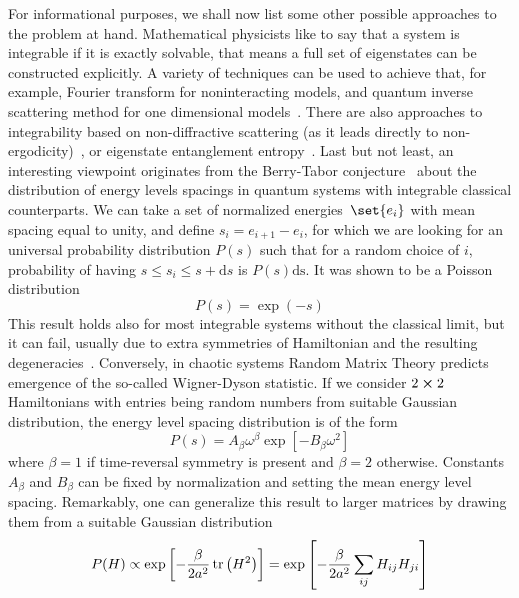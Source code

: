 For informational purposes, we shall now list some other possible approaches to the problem at
hand. Mathematical physicists like to say that a system is integrable if it is exactly
solvable, that means a full set of eigenstates can be constructed explicitly. A variety
of techniques can be used to achieve that, for example, Fourier transform for
noninteracting models, and quantum inverse scattering method for one dimensional 
models~\autocite{Faddeev1996,Korepin1993,Ilievski2014}. There are also approaches
to integrability based on non-diffractive scattering (as it leads directly 
to non-ergodicity)~\autocite{Sutherland2004}, or eigenstate entanglement entropy~\autocite{ydzba2020}.
Last but not least, an interesting viewpoint originates from the Berry-Tabor conjecture~\autocite{Berry1977} about the
distribution of energy levels spacings in quantum systems with integrable classical counterparts.
We can take a set of normalized energies~\(\set{e_i}\) with mean spacing equal to unity,
and define \(s_i = e_{i+1}-e_i\), for which we are looking for an universal probability
distribution \(P(s)\) such that for a random choice of \(i\), probability of having
\(s \leq s_i \leq s+\mathrm{d}s\) is \(P(s)\mathrm{ds}\). It was shown to be a Poisson
distribution~\autocite{Ott2002}
\begin{equation}
    P(s) = \exp(-s)
\end{equation}
This result holds also for most integrable systems without the classical limit, but it can fail,
usually due to extra symmetries of Hamiltonian and the resulting degeneracies~\autocite{DAlessio2016}.
Conversely, in chaotic systems Random Matrix Theory predicts emergence of the so-called Wigner-Dyson
statistic. If we consider \(2\cross 2\) Hamiltonians with entries being random numbers from suitable
Gaussian distribution, the energy level spacing distribution is of the form~\autocite{DAlessio2016}
\begin{equation}
    P(s) = A_{\beta} \omega^{\beta} \exp\left[-B_{\beta} \omega^2\right]
\end{equation}
where \(\beta = 1\) if time-reversal symmetry is present and \(\beta = 2\) otherwise.
Constants \(A_{\beta}\) and \(B_{\beta}\) can be fixed by normalization and setting the mean energy level
spacing. Remarkably, one can generalize this result to larger matrices by drawing
them from a suitable Gaussian distribution~\autocite{Alhassid2000}
\begin{equation}
    P(H) \propto \exp\left[-\frac{\beta}{2a^2}\tr\left(H^2\right)\right] =
    \exp\left[-\frac{\beta}{2a^2}\sum_{ij} H_{ij}H_{ji}\right]
    \label{eq:GOE}
\end{equation}

